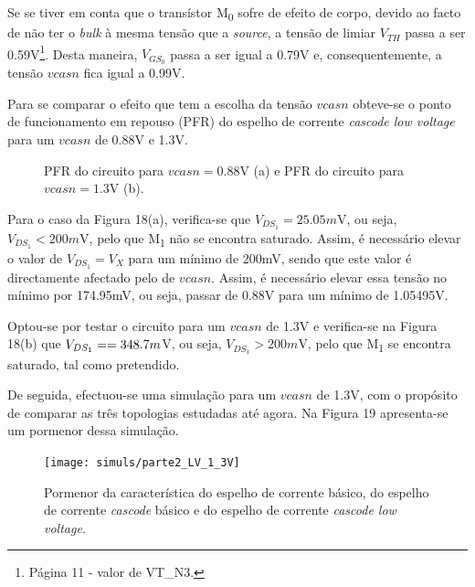 \documentclass[11pt]{article}
\numberwithin{equation}{section}
\begin{document}
\vspace{1mm}
Se se tiver em conta que o transístor M\textsubscript{0} sofre de efeito de corpo, devido ao facto de não ter o \textit{bulk} à mesma tensão que a \textit{source}, a tensão de limiar $V_{TH}$ passa a ser 0.59V\footnote{Página 11 - valor de VT\_N3.}. Desta maneira, $V_{GS_{0}}$ passa a ser igual a 0.79V e, consequentemente, a tensão $vcasn$ fica igual a 0.99V.  

Para se comparar o efeito que tem a escolha da tensão $vcasn$ obteve-se o ponto de funcionamento em repouso (PFR) do espelho de corrente \textit{cascode low voltage} para um $vcasn$ de 0.88V e 1.3V.

\begin{figure}[H]
	\centering
	\hspace{3mm}
	\vspace{-0.8em}
	\caption{PFR do circuito para $vcasn = 0.88$V (a) e PFR do circuito para  $vcasn = 1.3$V (b).}
	\vspace{-0.8em}
\end{figure}

Para o caso da Figura 18(a), verifica-se que $V_{DS_{1}} = 25.05m$V, ou seja, $V_{DS_{1}} < 200m$V, pelo que M\textsubscript{1} não se encontra saturado. Assim, é necessário elevar o valor de $V_{DS_{1}} = V_{X}$ para um mínimo de 200mV, sendo que este valor é directamente afectado pelo de $vcasn$. Assim, é necessário elevar essa tensão no mínimo por 174.95mV, ou seja, passar de 0.88V para um mínimo de 1.05495V.

Optou-se por testar o circuito para um $vcasn$ de 1.3V e verifica-se na Figura 18(b) que $V_{DS_{1}} = \linebreak = 348.7m$V, ou seja, $V_{DS_{1}} > 200m$V, pelo que M\textsubscript{1} se encontra saturado, tal como pretendido. 

De seguida, efectuou-se uma simulação para um $vcasn$ de 1.3V, com o propósito de comparar as três topologias estudadas até agora. Na Figura 19 apresenta-se um pormenor dessa simulação.

\begin{figure}[H]
	\centering
	\texttt{[image: simuls/parte2\_LV\_1\_3V]}
	\vspace{-0.8em}
	\caption{Pormenor da característica do espelho de corrente básico, do espelho de corrente \textit{cascode} básico e do espelho de corrente \textit{cascode low voltage}.}
	\vspace{-0.8em}
\end{figure}
\end{document}
